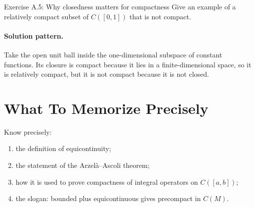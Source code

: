 \documentclass[header={Appendix A Exam Study Notes}]{study-note}
\begin{document}
\begin{exbox}{Exercise A.5: Why closedness matters for compactness}
Give an example of a relatively compact subset of $C([0,1])$ that is not compact.

\paragraph{Solution pattern.}
Take the open unit ball inside the one-dimensional subspace of constant functions. Its closure is compact because it lies in a finite-dimensional space, so it is relatively compact, but it is not compact because it is not closed.
\end{exbox}

\section{What To Memorize Precisely}

\begin{focusbox}
Know precisely:
\begin{enumerate}
\item the definition of equicontinuity;
\item the statement of the Arzel\`a--Ascoli theorem;
\item how it is used to prove compactness of integral operators on $C([a,b])$;
\item the slogan: bounded plus equicontinuous gives precompact in $C(M)$.
\end{enumerate}
\end{focusbox}
\end{document}
